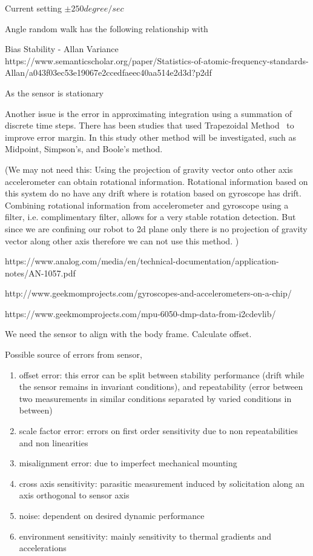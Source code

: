 \documentclass{article}
\begin{document}
Current setting $\pm 250 degree / sec$



Angle random walk has the following relationship with 

Bias Stability - Allan Variance
https://www.semanticscholar.org/paper/Statistics-of-atomic-frequency-standards-Allan/a043f03ec53e19067e2ccedfaeec40aa514e2d3d?p2df



As the sensor is stationary 

Another issue is the error in approximating integration using a summation of discrete time steps. There has been studies that used Trapezoidal Method~\cite{seifert2007implementing} to improve error margin. In this study other method will be investigated, such as Midpoint, Simpson's, and Boole's method.

(We may not need this: Using the projection of gravity vector onto other axis accelerometer can obtain rotational information. Rotational information based on this system do no have any drift where is rotation based on gyroscope has drift. Combining rotational information from accelerometer and gyroscope using a filter, i.e. complimentary filter, allows for a very stable rotation detection. But since we are confining our robot to 2d plane only there is no projection of gravity vector along other axis therefore we can not use this method. )

https://www.analog.com/media/en/technical-documentation/application-notes/AN-1057.pdf

http://www.geekmomprojects.com/gyroscopes-and-accelerometers-on-a-chip/

https://www.geekmomprojects.com/mpu-6050-dmp-data-from-i2cdevlib/

We need the sensor to align with the body frame. Calculate offset.

Possible source of errors from sensor,
\begin{enumerate}
\item offset error: this error can be split between stability performance (drift while the sensor remains in invariant conditions), and repeatability (error between two measurements in similar conditions separated by varied conditions in between)
\item scale factor error: errors on first order sensitivity due to non repeatabilities and non linearities
\item misalignment error: due to imperfect mechanical mounting
\item cross axis sensitivity: parasitic measurement induced by solicitation along an axis orthogonal to sensor axis
\item noise: dependent on desired dynamic performance
\item environment sensitivity: mainly sensitivity to thermal gradients and accelerations
\end{enumerate}
\end{document}
